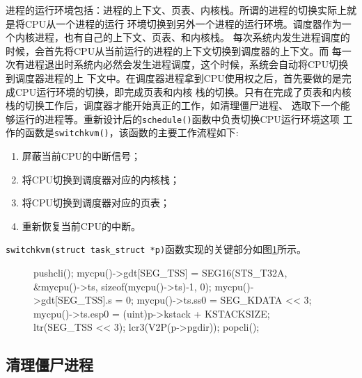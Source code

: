 \documentclass{swfuthesism}
\begin{document}
进程的运行环境包括：进程的上下文、页表、内核栈。所谓的进程的切换实际上就是将CPU从一个进程的运行
环境切换到另外一个进程的运行环境。调度器作为一个内核进程，也有自己的上下文、页表、和内核栈。
每次系统内发生进程调度的时候，会首先将CPU从当前运行的进程的上下文切换到调度器的上下文。而
每一次有进程退出时系统内必然会发生进程调度，这个时候，系统会自动将CPU切换到调度器进程的上
下文中。在调度器进程拿到CPU使用权之后，首先要做的是完成CPU运行环境的切换，即完成页表和内核
栈的切换。只有在完成了页表和内核栈的切换工作后，调度器才能开始真正的工作，如清理僵尸进程、
选取下一个能够运行的进程等。重新设计后的\texttt{schedule()}函数中负责切换CPU运行环境这项
工作的函数是\texttt{switchkvm()}，该函数的主要工作流程如下:
\begin{enumerate}
\item 屏蔽当前CPU的中断信号；
\item 将CPU切换到调度器对应的内核栈；
\item 将CPU切换到调度器对应的页表；
\item 重新恢复当前CPU的中断。
\end{enumerate}
\texttt{switchkvm(struct task\_struct *p)}函数实现的关键部分如图\ref{fig:lst:kvmcode}所示。
\begin{figure}
  \begin{codeblock}
\begin{ccode}
  pushcli();
  mycpu()->gdt[SEG_TSS] = SEG16(STS_T32A, &mycpu()->ts,
                                sizeof(mycpu()->ts)-1, 0);
  mycpu()->gdt[SEG_TSS].s = 0;
  mycpu()->ts.ss0 = SEG_KDATA << 3;
  mycpu()->ts.esp0 = (uint)p->kstack + KSTACKSIZE;
  ltr(SEG_TSS << 3);
  lcr3(V2P(p->pgdir));  
  popcli();
\end{ccode}
  \end{codeblock}
  \label{fig:lst:kvmcode}
\end{figure}
\subsection{清理僵尸进程}
\end{document}
